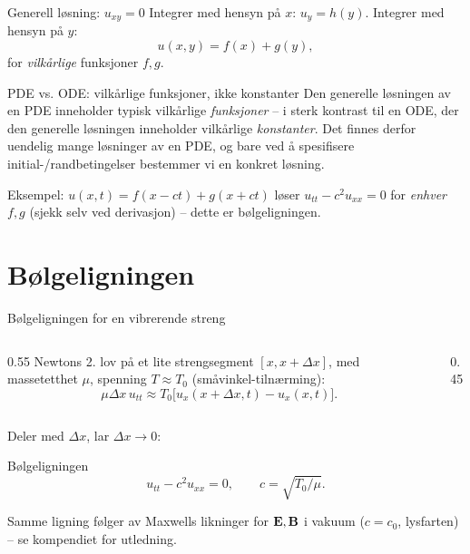 \documentclass[11pt,aspectratio=169]{beamer}
\begin{document}
\begin{frame}{Generell løsning: $u_{xy}=0$}
Integrer med hensyn på $x$: $u_y=h(y)$. Integrer med hensyn på $y$:
\begin{equation}
u(x,y) = f(x) + g(y),
\end{equation}
for \emph{vilkårlige} funksjoner $f,g$.
\begin{remb}{PDE vs. ODE: vilkårlige funksjoner, ikke konstanter}
Den generelle løsningen av en PDE inneholder typisk vilkårlige \emph{funksjoner} -- i sterk kontrast til en ODE, der den generelle løsningen inneholder vilkårlige \emph{konstanter}. Det finnes derfor uendelig mange løsninger av en PDE, og bare ved å spesifisere initial-/randbetingelser bestemmer vi en konkret løsning.
\end{remb}
Eksempel: $u(x,t)=f(x-ct)+g(x+ct)$ løser $u_{tt}-c^2u_{xx}=0$ for \emph{enhver} $f,g$ (sjekk selv ved derivasjon) -- dette er bølgeligningen.
\end{frame}

\section{Bølgeligningen}

\begin{frame}{Bølgeligningen for en vibrerende streng}
\begin{columns}
\begin{column}{0.55\textwidth}
Newtons 2. lov på et lite strengsegment $[x,x+\Delta x]$, med massetetthet $\mu$, spenning $T\approx T_0$ (småvinkel-tilnærming):
\[
\mu\Delta x\,u_{tt} \approx T_0\big[u_x(x+\Delta x,t)-u_x(x,t)\big].
\]
\end{column}
\begin{column}{0.45\textwidth}
\end{column}
\end{columns}
Deler med $\Delta x$, lar $\Delta x\to0$:
\begin{oppsumb}{Bølgeligningen}
\[
u_{tt} - c^2 u_{xx} = 0, \qquad c = \sqrt{T_0/\mu}.
\]
\end{oppsumb}
Samme ligning følger av Maxwells likninger for $\mathbf{E},\mathbf{B}$ i vakuum ($c=c_0$, lysfarten) -- se kompendiet for utledning.
\end{frame}
\end{document}
